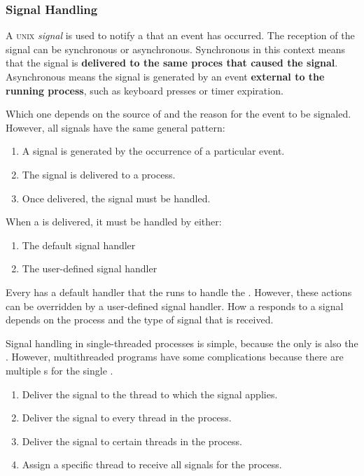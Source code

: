 \subsubsection{Signal Handling}\label{subsubsec:Signal_Handling}
\begin{definition}[Signal]\label{def:Signal}
  A \textsc{unix} \emph{signal} is used to notify a  that an event has occurred.
  The reception of the signal can be synchronous or asynchronous.
  Synchronous in this context means that the signal is \textbf{delivered to the same proces that caused the signal}.
  Asynchronous means the signal is generated by an event \textbf{external to the running process}, such as keyboard presses or timer expiration.

  Which one depends on the source of and the reason for the event to be signaled.
  However, all signals have the same general pattern:
  \begin{enumerate}[noitemsep]
  \item A signal is generated by the occurrence of a particular event.
  \item The signal is delivered to a process.
  \item Once delivered, the signal must be handled.
  \end{enumerate}
\end{definition}

When a  is delivered, it must be handled by either:
\begin{enumerate}[noitemsep]
\item The default signal handler
\item The user-defined signal handler
\end{enumerate}

Every  has a default handler that the  runs to handle the .
However, these actions can be overridden by a user-defined signal handler.
How a  responds to a signal depends on the process and the type of signal that is received.

Signal handling in single-threaded processes is simple, because the only  is also the .
However, multithreaded programs have some complications because there are multiple s for the single .
\begin{enumerate}[noitemsep]
\item Deliver the signal to the thread to which the signal applies.
\item Deliver the signal to every thread in the process.
\item Deliver the signal to certain threads in the process.
\item Assign a specific thread to receive all signals for the process.
\end{enumerate}

